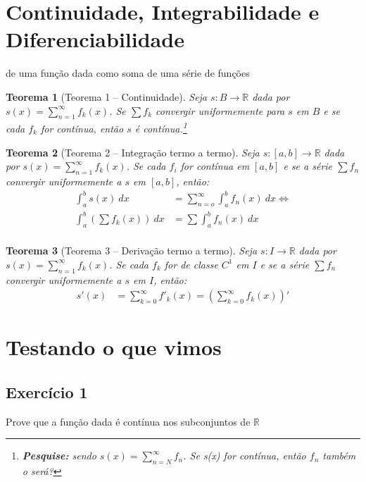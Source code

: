 \documentclass[12pt,openany, letterpaper]{book}
\newtheorem{theorem}{Teorema}[section]
\newcommand{\soma}[2][n]{\sum_{{#1} = #2}^\infty}
\newcommand{\defini}[3][\mathds{R}]{#2: #3 \rightarrow {#1}}
\newcommand{\E}[1]{Exercício #1}
\begin{document}
 \section{Continuidade, Integrabilidade e Diferenciabilidade} {de uma função dada como soma de uma série de funções}
 
\begin{theorem}[Teorema 1 -- Continuidade] \label{T1 C4}
 Seja $\defini{s}{B}$ dada por $s(x) = \displaystyle{\soma{1} f_k(x)} $. Se $\sum f_k$ convergir uniformemente para $s$ em $B$ e se cada $f_k$ for contínua, então $s$ é contínua.\footnote{\textbf{Pesquise:} sendo $s(x) = \soma{N} f_n$. Se s(x) for contínua, então $f_n$ também o será?}
 \end{theorem}
 
\begin{theorem}[Teorema 2 -- Integração termo a termo] \label{T2 C4}
Seja $\defini{s}{[a,b]}$ dada por $s(x) = \displaystyle{\soma{1} f_k(x)}$. Se cada $f_i$ for contínua em $[a,b]$ e se a série $\sum f_n$ convergir uniformemente a $s$ em $[a,b]$, então: \begin{align*}
\int_a^b  s(x) \ dx &= \soma{o} \int_a^b  f_n(x) \ dx  \Longleftrightarrow\\
\int_a^b \left( \sum f_k(x)\right) \ dx &= \sum \int_a^b  f_n(x) \ dx \\
\end{align*}

\end{theorem}

\begin{theorem}[Teorema 3 -- Derivação termo a termo] \label{T3 C4}
Seja $\defini{s}{I}$ dada por $s(x) = \displaystyle{\soma{1} f_k(x)} $. Se cada $f_k$ for de classe $C^1$ em $I$ e se a série $\sum f_n$ convergir uniformemente a $s$ em $I$, então: \begin{align*}
s'(x) &= \soma[k]{0} f'_k(x) = \left( \soma[k]{0} f_k(x)\right)'
\end{align*}
\end{theorem}

\section{Testando o que vimos}

\subsection*{\E{1}} {Prove que a função dada é contínua nos subconjuntos de $\mathds{R}$} 
\end{document}
